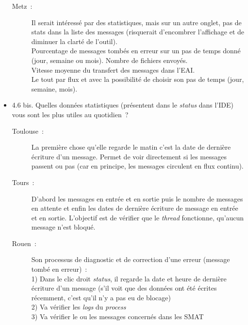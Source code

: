 \begin{itemize}
\begin{description}
	  	\item[Metz~:] Il serait intéressé par des statistiques, mais sur un autre
	  	onglet, pas de stats dans la liste des messages (risquerait d’encombrer
	  	l’affichage et de diminuer la clarté de l’outil).\\
		Pourcentage de messages tombés en erreur sur un pas de temps donné (jour,
		semaine ou mois). Nombre de fichiers envoyés.\\
		Vitesse moyenne du transfert des messages dans l’EAI.\\
		Le tout par flux et avec la possibilité de choisir son pas de temps (jour,
		semaine, mois).
	  \end{description}
	  
	  \item 4.6 bis. Quelles données statistiques (présentent dans le
	  \textit{status} dans l’IDE) vous sont les plus utiles au quotidien~?
	  \begin{description}
	  	\item[Toulouse~:] La première chose qu’elle regarde le matin c’est la date
	  	de dernière écriture d’un message. Permet de voir directement si les
	  	messages passent ou pas (car en principe, les messages circulent en flux
	  	continu).
	  	\item[Tours~:] D’abord les messages en entrée et en sortie puis le nombre de
	  	messages en attente et enfin les dates de dernière écriture de message en
	  	entrée et en sortie. L’objectif est de vérifier que le \textit{thread}
	  	fonctionne, qu’aucun message n’est bloqué.
	  	\item[Rouen~:] Son processus de diagnostic et de correction d’une erreur
	  	(message tombé en erreur)~:\\
		1)	Dans le clic droit \textit{status}, il regarde la date et heure de dernière
		écriture d’un message (s’il voit que des données ont été écrites récemment,
		c’est qu’il n’y a pas eu de blocage)\\
		2)	Va vérifier les \textit{logs} du \textit{process} \\
		3)	Va vérifier le ou les messages concernés dans les SMAT
	  \end{description}
	  

\end{itemize}
